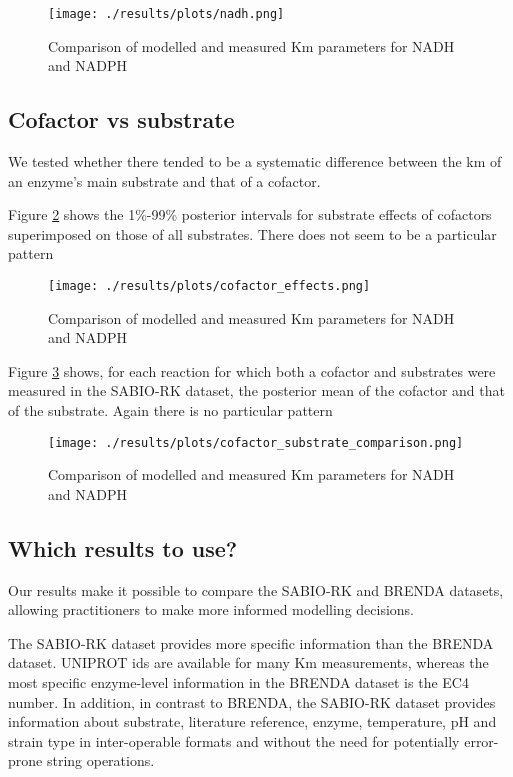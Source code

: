 \documentclass[11pt]{article}
\begin{document}
\begin{figure}[htbp]
\centering
\texttt{[image: ./results/plots/nadh.png]}
\caption{\label{fig:orgba3d2b1}Comparison of modelled and measured Km parameters for NADH and NADPH}
\end{figure}

\subsection{Cofactor vs substrate}
\label{sec:org212ae00}
We tested whether there tended to be a systematic difference between the km of
an enzyme's main substrate and that of a cofactor. 

Figure \ref{fig:orgec5d6be} shows the 1\%-99\% posterior intervals for substrate
effects of cofactors superimposed on those of all substrates. There does not
seem to be a particular pattern

\begin{figure}[htbp]
\centering
\texttt{[image: ./results/plots/cofactor\_effects.png]}
\caption{\label{fig:orgec5d6be}Comparison of modelled and measured Km parameters for NADH and NADPH}
\end{figure}

Figure \ref{fig:org804e529} shows, for each reaction for which both a
cofactor and substrates were measured in the SABIO-RK dataset, the posterior
mean of the cofactor and that of the substrate. Again there is no particular
pattern

\begin{figure}[htbp]
\centering
\texttt{[image: ./results/plots/cofactor\_substrate\_comparison.png]}
\caption{\label{fig:org804e529}Comparison of modelled and measured Km parameters for NADH and NADPH}
\end{figure}

\subsection{Which results to use?}
\label{sec:orgabb80dc}

Our results make it possible to compare the SABIO-RK and BRENDA datasets,
allowing practitioners to make more informed modelling decisions.

The SABIO-RK dataset provides more specific information than the BRENDA
dataset. UNIPROT ids are available for many Km measurements, whereas the most
specific enzyme-level information in the BRENDA dataset is the EC4 number. In
addition, in contrast to BRENDA, the SABIO-RK dataset provides information about
substrate, literature reference, enzyme, temperature, pH and strain type in
inter-operable formats and without the need for potentially error-prone string
operations.
\end{document}
